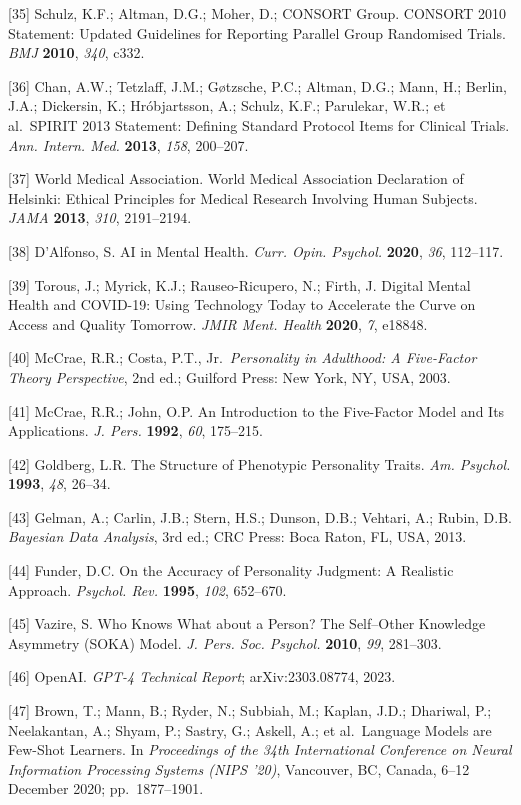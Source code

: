 {[}35{]} Schulz, K.F.; Altman, D.G.; Moher, D.; CONSORT Group. CONSORT 2010 Statement: Updated Guidelines for Reporting Parallel Group Randomised Trials. \emph{BMJ} \textbf{2010}, \emph{340}, c332.

{[}36{]} Chan, A.W.; Tetzlaff, J.M.; Gøtzsche, P.C.; Altman, D.G.; Mann, H.; Berlin, J.A.; Dickersin, K.; Hróbjartsson, A.; Schulz, K.F.; Parulekar, W.R.; et al.~SPIRIT 2013 Statement: Defining Standard Protocol Items for Clinical Trials. \emph{Ann. Intern. Med.} \textbf{2013}, \emph{158}, 200--207.

{[}37{]} World Medical Association. World Medical Association Declaration of Helsinki: Ethical Principles for Medical Research Involving Human Subjects. \emph{JAMA} \textbf{2013}, \emph{310}, 2191--2194.

{[}38{]} D'Alfonso, S. AI in Mental Health. \emph{Curr. Opin. Psychol.} \textbf{2020}, \emph{36}, 112--117.

{[}39{]} Torous, J.; Myrick, K.J.; Rauseo-Ricupero, N.; Firth, J. Digital Mental Health and COVID-19: Using Technology Today to Accelerate the Curve on Access and Quality Tomorrow. \emph{JMIR Ment. Health} \textbf{2020}, \emph{7}, e18848.

{[}40{]} McCrae, R.R.; Costa, P.T., Jr.~\emph{Personality in Adulthood: A Five-Factor Theory Perspective}, 2nd ed.; Guilford Press: New York, NY, USA, 2003.

{[}41{]} McCrae, R.R.; John, O.P. An Introduction to the Five-Factor Model and Its Applications. \emph{J. Pers.} \textbf{1992}, \emph{60}, 175--215.

{[}42{]} Goldberg, L.R. The Structure of Phenotypic Personality Traits. \emph{Am. Psychol.} \textbf{1993}, \emph{48}, 26--34.

{[}43{]} Gelman, A.; Carlin, J.B.; Stern, H.S.; Dunson, D.B.; Vehtari, A.; Rubin, D.B. \emph{Bayesian Data Analysis}, 3rd ed.; CRC Press: Boca Raton, FL, USA, 2013.

{[}44{]} Funder, D.C. On the Accuracy of Personality Judgment: A Realistic Approach. \emph{Psychol. Rev.} \textbf{1995}, \emph{102}, 652--670.

{[}45{]} Vazire, S. Who Knows What about a Person? The Self--Other Knowledge Asymmetry (SOKA) Model. \emph{J. Pers. Soc. Psychol.} \textbf{2010}, \emph{99}, 281--303.

{[}46{]} OpenAI. \emph{GPT-4 Technical Report}; arXiv:2303.08774, 2023.

{[}47{]} Brown, T.; Mann, B.; Ryder, N.; Subbiah, M.; Kaplan, J.D.; Dhariwal, P.; Neelakantan, A.; Shyam, P.; Sastry, G.; Askell, A.; et al.~Language Models are Few-Shot Learners. In \emph{Proceedings of the 34th International Conference on Neural Information Processing Systems (NIPS '20)}, Vancouver, BC, Canada, 6--12 December 2020; pp.~1877--1901.

